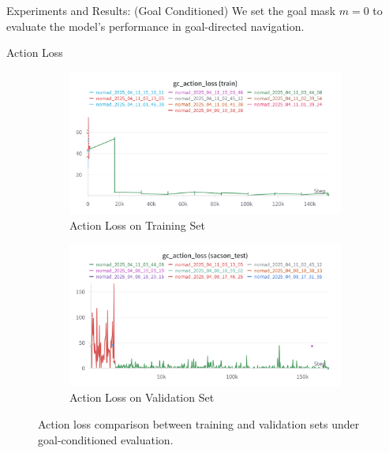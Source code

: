 \documentclass{beamer}
\begin{document}
\begin{frame}{Experiments and Results: (Goal Conditioned)}
We set the goal mask $m = 0$ to evaluate the model's performance in goal-directed navigation.
    \begin{block}{Action Loss}
        \begin{figure}[H]
            \centering
            \begin{subfigure}[b]{0.48\textwidth}
                \centering
                \includegraphics[width=\textwidth]{images/gc_actionloss_nomad.png}
                \caption{Action Loss on Training Set}
                \label{fig:gc_action_loss_train}
            \end{subfigure}
            \hfill
            \begin{subfigure}[b]{0.48\textwidth}
                \centering
                \includegraphics[width=\textwidth]{images/gc_actionloss_test_nomad.png}
                \caption{Action Loss on Validation Set}
                \label{fig:gc_action_loss_val}
            \end{subfigure}
            \caption{Action loss comparison between training and validation sets under goal-conditioned evaluation.}
        \end{figure}
    \end{block}
    \end{frame}
\end{document}
